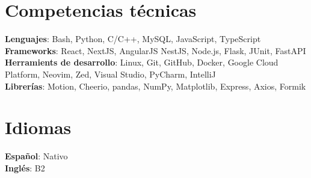 \documentclass[letterpaper,11pt]{article}
\begin{document}
\section{Competencias técnicas}
 \begin{itemize}[leftmargin=0.15in, label={}]
    \small{\item{
     \textbf{Lenguajes}{: Bash, Python, C/C++, MySQL, JavaScript, TypeScript} \\
     \textbf{Frameworks}{: React, NextJS, AngularJS NestJS, Node.js, Flask, JUnit, FastAPI} \\
     \textbf{Herramients de desarrollo}{: Linux, Git, GitHub, Docker, Google Cloud Platform, Neovim, Zed, Visual Studio, PyCharm, IntelliJ} \\
     \textbf{Librerías}{: Motion, Cheerio, pandas, NumPy, Matplotlib, Express, Axios, Formik}
    }}
 \end{itemize}

 \section{Idiomas}
 \begin{itemize}[leftmargin=0.15in, label={}]
   \small{\item{
       \textbf{Español}{: Nativo} \\
       \textbf{Inglés}{: B2} \\
   }}
\end{itemize}

\end{document}
